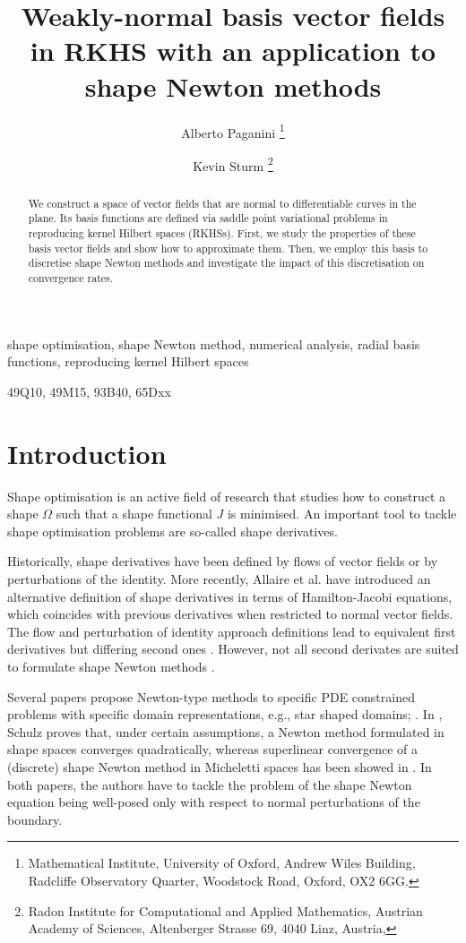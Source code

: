 \documentclass{siamart1116}
\title{Weakly-normal basis vector fields in RKHS with an application to shape Newton methods}
\author{
  Alberto Paganini
  \thanks{Mathematical Institute, University of Oxford, Andrew Wiles Building, Radcliffe Observatory Quarter, Woodstock Road, Oxford, OX2 6GG. \email{paganini@maths.ac.ox.uk}}
  \and
  Kevin Sturm
 \thanks{Radon Institute for Computational and Applied Mathematics, Austrian Academy of Sciences, Altenberger Strasse 69, 4040 Linz, Austria, \email{kevin.sturm@oeaw.ac.at}}
  }
\numberwithin{theorem}{section}
\begin{document}
\maketitle

\begin{abstract}
We construct a space of vector fields that are normal to differentiable curves in the plane.
Its basis functions are defined via saddle point variational problems in
reproducing kernel Hilbert spaces (RKHSs).
First, we study the properties of these basis vector fields and show how to approximate them.
Then, we employ this basis to discretise shape Newton methods and
investigate the impact of this discretisation on convergence rates.
\end{abstract}

\begin{keywords}
shape optimisation, shape Newton method, numerical analysis, radial basis functions, reproducing kernel Hilbert spaces	
\end{keywords}

\begin{AMS}
 49Q10, 49M15, 93B40, 65Dxx	
\end{AMS}

\section{Introduction}
Shape optimisation is an active field of research that studies how
to construct a shape $\Omega$ such that a shape functional $J$ is minimised.  An important tool to tackle shape optimisation problems are so-called shape derivatives.
 
Historically, shape derivatives \cite{delfourZolesioB,HenrotPierre05, SokolowskiZolesio1}
have been defined by flows of vector fields or by perturbations of the identity.
More recently, Allaire et al. \cite{AlCaVi16} have introduced an alternative definition of shape derivatives
in terms of Hamilton-Jacobi equations, which coincides with previous derivatives when restricted to normal vector fields. The flow and perturbation of identity approach definitions lead to equivalent first derivatives but differing second ones \cite{delfourZolesioB}. 
However, not all second derivates are suited to formulate shape Newton methods
\cite{sturm3, Sc17}.

Several papers propose Newton-type methods to specific PDE constrained problems with specific domain representations, e.g., star shaped domains; \cite{EPHA1,EP1,EPHASH1,SCSIWE1,SCSIWE2}.
In \cite{Schulz1}, Schulz proves that, under certain assumptions, a Newton method formulated in shape spaces \cite{RingWirth1} converges quadratically, whereas
superlinear convergence of a (discrete) shape Newton method
in Micheletti spaces has been showed in \cite{sturm3}. In both papers, the authors have to tackle the problem of
the shape Newton equation being well-posed only with respect to normal perturbations of the boundary.
\end{document}
